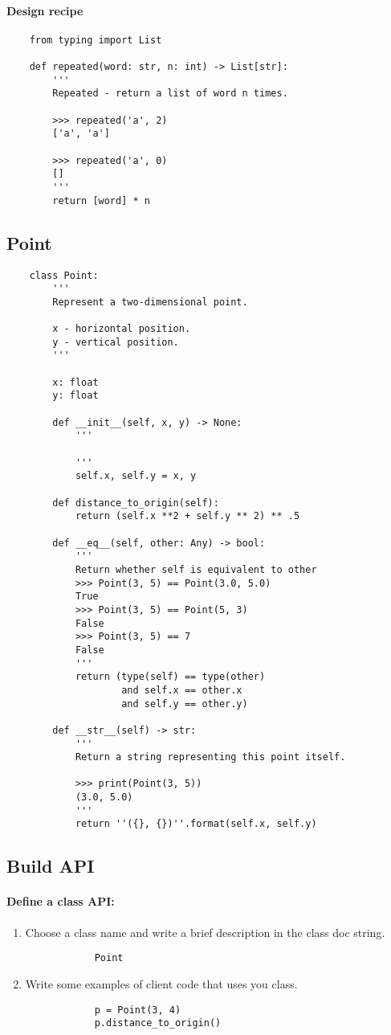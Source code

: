 \documentclass{article}
\begin{document}
	\paragraph{Design recipe}
	\begin{verbatim}
	from typing import List

	def repeated(word: str, n: int) -> List[str]:
		'''
		Repeated - return a list of word n times.

		>>> repeated('a', 2)
		['a', 'a']

		>>> repeated('a', 0)
		[]
		'''
		return [word] * n
	\end{verbatim}
	\subsection{Point}
	\begin{verbatim}
	class Point:
		'''
		Represent a two-dimensional point.

		x - horizontal position.
		y - vertical position.
		'''

		x: float
		y: float

		def __init__(self, x, y) -> None:
			'''

			'''
			self.x, self.y = x, y

		def distance_to_origin(self):
			return (self.x **2 + self.y ** 2) ** .5

		def __eq__(self, other: Any) -> bool:
			'''
			Return whether self is equivalent to other
			>>> Point(3, 5) == Point(3.0, 5.0)
			True
			>>> Point(3, 5) == Point(5, 3)
			False
			>>> Point(3, 5) == 7
			False
			'''
			return (type(self) == type(other)
					and self.x == other.x
					and self.y == other.y)

		def __str__(self) -> str:
			'''
			Return a string representing this point itself.

			>>> print(Point(3, 5))
			(3.0, 5.0)
			'''
			return ''({}, {})''.format(self.x, self.y)

	\end{verbatim}
	\subsection{Build API}
	\paragraph{Define a class API:}
	\begin{enumerate}
		\item Choose a class name and write a brief description in the class doc string.
		\begin{verbatim}
			Point
		\end{verbatim}
		\item Write some examples of client code that uses you class.
		\begin{verbatim}
			p = Point(3, 4)
			p.distance_to_origin()
		\end{verbatim}
	\end{enumerate}
\end{document}
